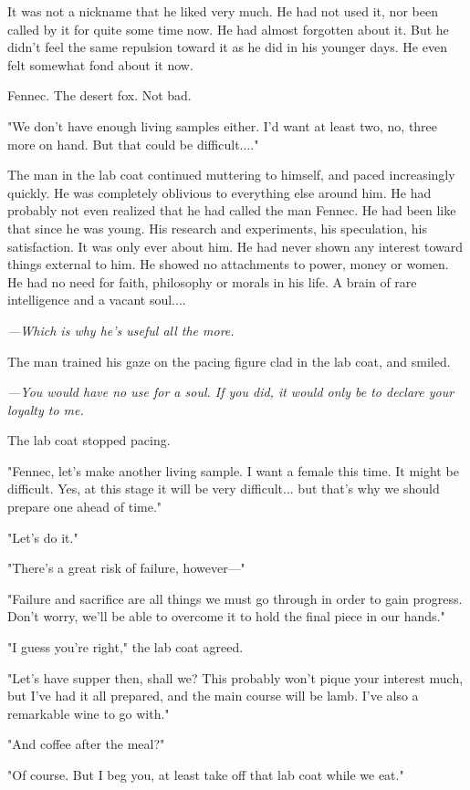 It was not a nickname that he liked very much. He had not used it, nor
been called by it for quite some time now. He had almost forgotten about
it. But he didn't feel the same repulsion toward it as he did in his
younger days. He even felt somewhat fond about it now.

Fennec. The desert fox. Not bad.

"We don't have enough living samples either. I'd want at least two, no,
three more on hand. But that could be difficult...."

The man in the lab coat continued muttering to himself, and paced
increasingly quickly. He was completely oblivious to everything else
around him. He had probably not even realized that he had called the man
Fennec. He had been like that since he was young. His research and
experiments, his speculation, his satisfaction. It was only ever about
him. He had never shown any interest toward things external to him. He
showed no attachments to power, money or women. He had no need for
faith, philosophy or morals in his life. A brain of rare intelligence
and a vacant soul....

\emph{---Which is why he's useful all the more.}

The man trained his gaze on the pacing figure clad in the lab coat, and
smiled.

\emph{---You would have no use for a soul. If you did, it would only be to
declare your loyalty to me.}

The lab coat stopped pacing.

"Fennec, let's make another living sample. I want a female this time. It
might be difficult. Yes, at this stage it will be very difficult... but
that's why we should prepare one ahead of time."

"Let's do it."

"There's a great risk of failure, however---"

"Failure and sacrifice are all things we must go through in order to
gain progress. Don't worry, we'll be able to overcome it to hold the
final piece in our hands."

"I guess you're right," the lab coat agreed.

"Let's have supper then, shall we? This probably won't pique your
interest much, but I've had it all prepared, and the main course will be
lamb. I've also a remarkable wine to go with."

"And coffee after the meal?"

"Of course. But I beg you, at least take off that lab coat while we
eat."

